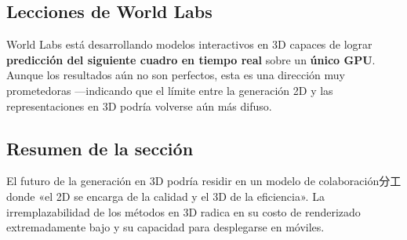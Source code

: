 \subsection{Lecciones de World Labs}

World Labs está desarrollando modelos interactivos en 3D capaces de lograr \textbf{predicción del siguiente cuadro en tiempo real} sobre un \textbf{único GPU}. Aunque los resultados aún no son perfectos, esta es una dirección muy prometedoras —indicando que el límite entre la generación 2D y las representaciones en 3D podría volverse aún más difuso.

\subsection{Resumen de la sección}

El futuro de la generación en 3D podría residir en un modelo de colaboración分工 donde «el 2D se encarga de la calidad y el 3D de la eficiencia». La irremplazabilidad de los métodos en 3D radica en su costo de renderizado extremadamente bajo y su capacidad para desplegarse en móviles.
